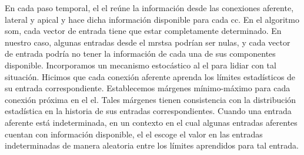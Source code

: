 
En cada paso temporal, el \gls{el} reúne la información desde las conexiones aferente, lateral y apical y hace dicha información disponible para cada \gls{cc}. En el algoritmo \gls{som}, cada vector de entrada tiene que estar completamente determinado. En nuestro caso, algunas entradas desde el \gls{mrstsa} podrían ser nulas, y cada vector de entrada podría no tener la información de cada una de sus componentes disponible. Incorporamos un mecanismo estocástico al \gls{el} para lidiar con tal situación. Hicimos que cada conexión aferente aprenda los límites estadísticos de su entrada correspondiente. Establecemos márgenes mínimo-máximo para cada conexión próxima en el \gls{el}. Tales márgenes tienen consistencia con la distribución estadística en la historia de sus entradas correspondientes. Cuando una entrada aferente está indeterminada, en un contexto en el cual algunas entradas aferentes cuentan con información disponible, el \gls{el} escoge el valor en las entradas indeterminadas  de manera aleatoria entre los límites aprendidos para tal entrada.









